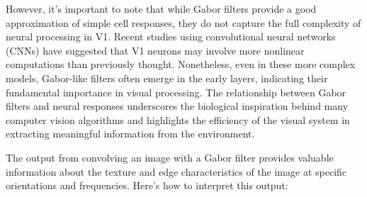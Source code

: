 \begin{figure}[h!]
\centering
\begin{tcolorbox}[every float=\centering, drop shadow, title=Varying Orientation and Wavelength of the Gabor Filters ,colback=white,colframe=WMgreen,
  colbacktitle=WMgreen,]
  \centering
{}
  \label{fig:gaborangles}
 \end{tcolorbox}
\end{figure}
\FloatBarrier

However, it's important to note that while Gabor filters provide a good approximation of simple cell responses, they do not capture the full complexity of neural processing in V1. Recent studies using convolutional neural networks (CNNs) have suggested that V1 neurons may involve more nonlinear computations than previously thought. Nonetheless, even in these more complex models, Gabor-like filters often emerge in the early layers, indicating their fundamental importance in visual processing. The relationship between Gabor filters and neural responses underscores the biological inspiration behind many computer vision algorithms and highlights the efficiency of the visual system in extracting meaningful information from the environment.

The output from convolving an image with a Gabor filter provides valuable information about the texture and edge characteristics of the image at specific orientations and frequencies. Here's how to interpret this output:

